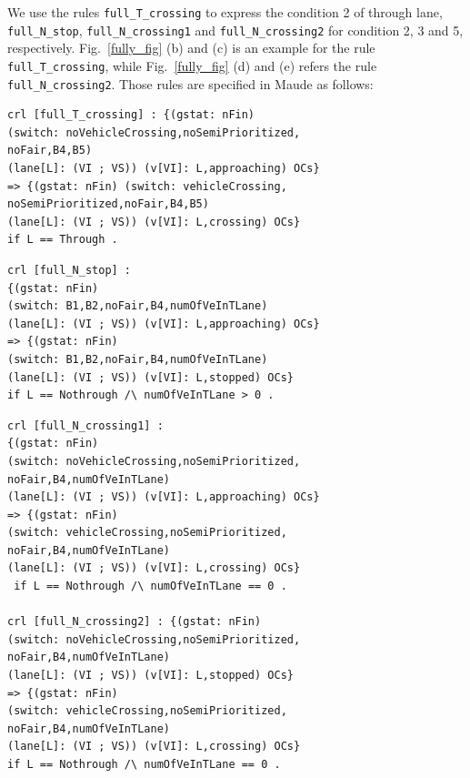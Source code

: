 \documentclass[10pt, conference, compsocconf]{IEEEtran}
\begin{document}
We use the rules \verb!full_T_crossing! to express the condition 2 of through lane, \verb!full_N_stop!, \verb!full_N_crossing1! and \verb!full_N_crossing2! for condition 2, 3 and 5, respectively. 
Fig.~\ref{fully_fig} (b) and (c) is an example for the rule \verb!full_T_crossing!, while Fig.~\ref{fully_fig} (d) and (e) refers the rule \verb!full_N_crossing2!.
Those rules are specified in Maude as follows:

\begin{footnotesize}
\begin{verbatim}
crl [full_T_crossing] : {(gstat: nFin) 
(switch: noVehicleCrossing,noSemiPrioritized,
noFair,B4,B5) 
(lane[L]: (VI ; VS)) (v[VI]: L,approaching) OCs} 
=> {(gstat: nFin) (switch: vehicleCrossing,
noSemiPrioritized,noFair,B4,B5) 
(lane[L]: (VI ; VS)) (v[VI]: L,crossing) OCs} 
if L == Through .
\end{verbatim}
\end{footnotesize}

\begin{footnotesize}
\begin{verbatim}
crl [full_N_stop] : 
{(gstat: nFin) 
(switch: B1,B2,noFair,B4,numOfVeInTLane) 
(lane[L]: (VI ; VS)) (v[VI]: L,approaching) OCs} 
=> {(gstat: nFin) 
(switch: B1,B2,noFair,B4,numOfVeInTLane) 
(lane[L]: (VI ; VS)) (v[VI]: L,stopped) OCs} 
if L == Nothrough /\ numOfVeInTLane > 0 .
\end{verbatim}
\end{footnotesize}


\begin{footnotesize}
\begin{verbatim}
crl [full_N_crossing1] : 
{(gstat: nFin) 
(switch: noVehicleCrossing,noSemiPrioritized,
noFair,B4,numOfVeInTLane) 
(lane[L]: (VI ; VS)) (v[VI]: L,approaching) OCs} 
=> {(gstat: nFin) 
(switch: vehicleCrossing,noSemiPrioritized,
noFair,B4,numOfVeInTLane) 
(lane[L]: (VI ; VS)) (v[VI]: L,crossing) OCs}
 if L == Nothrough /\ numOfVeInTLane == 0 .
 
crl [full_N_crossing2] : {(gstat: nFin) 
(switch: noVehicleCrossing,noSemiPrioritized,
noFair,B4,numOfVeInTLane) 
(lane[L]: (VI ; VS)) (v[VI]: L,stopped) OCs} 
=> {(gstat: nFin) 
(switch: vehicleCrossing,noSemiPrioritized,
noFair,B4,numOfVeInTLane) 
(lane[L]: (VI ; VS)) (v[VI]: L,crossing) OCs}
if L == Nothrough /\ numOfVeInTLane == 0 .
\end{verbatim}
\end{footnotesize}
\end{document}
